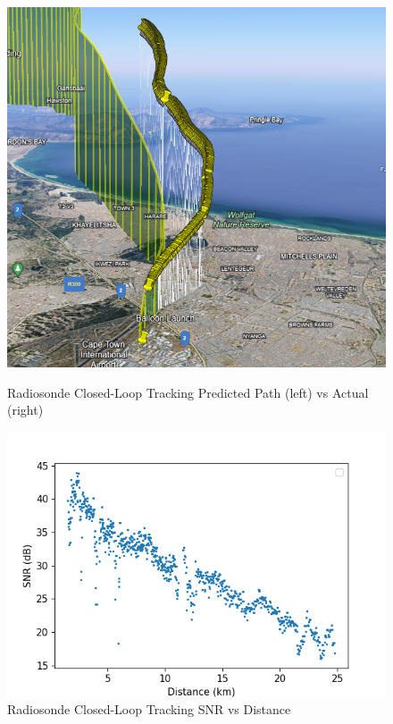 \begin{figure}[!htb]
  \begin{minipage}{.4\textwidth}
    \centering
    \includegraphics[width=0.85\linewidth]{radiosondePredictedVsActual}
    \caption{Radiosonde Closed-Loop Tracking Predicted Path (left) vs Actual (right)}
    \label{fig:radiosondePredictedVsActual}
  \end{minipage}
  \begin{minipage}{.6\textwidth}
    \centering
    \includegraphics[width=0.95\linewidth]{radiosondeSnr}
    \caption{Radiosonde Closed-Loop Tracking SNR vs Distance}
    \label{fig:radiosondeSnr}
  \end{minipage}
\end{figure}